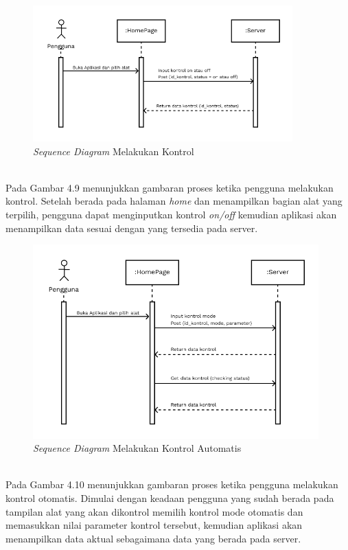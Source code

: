 \begin{flushleft}
\begin{justify}
\begin{enumerate}[label=\alph*.]
\begin{figure}[ht]
                \centering
                \includegraphics[width=10cm]{images/bab 4/Sequence kontrol.png}
                \caption{\textit{Sequence Diagram} Melakukan Kontrol}
            \end{figure}
            \\Pada Gambar 4.9 menunjukkan gambaran proses ketika pengguna melakukan kontrol. Setelah berada pada halaman \emph{home} dan menampilkan bagian alat yang terpilih, pengguna dapat menginputkan kontrol \emph{on/off} kemudian aplikasi akan menampilkan data sesuai dengan yang tersedia pada server.
            \begin{figure}[ht]
                \centering
                \includegraphics[width=11cm]{images/bab 4/Sequence kontrol Auto.png}
                \caption{\textit{Sequence Diagram} Melakukan Kontrol Automatis}
            \end{figure}
            \\Pada Gambar 4.10 menunjukkan gambaran proses ketika pengguna melakukan kontrol otomatis. Dimulai dengan keadaan pengguna yang sudah berada pada tampilan alat yang akan dikontrol memilih kontrol mode otomatis dan memasukkan nilai parameter kontrol tersebut, kemudian aplikasi akan menampilkan data aktual sebagaimana data yang berada pada server.
            \end{enumerate}


\end{justify}
\end{flushleft}
